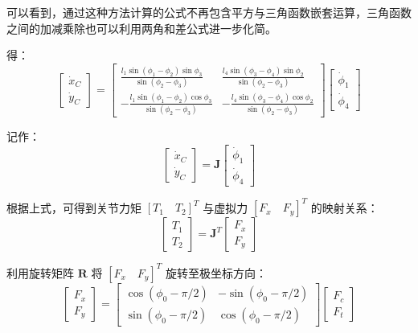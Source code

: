 \documentclass[
  oneside,
  degree=bachelor,
  fullwidthstop=false,
  fontset=fandol,
  times=false,
  minted=true,
  biblatex=true,
]{tongjithesis}
\begin{document}
可以看到，通过这种方法计算的公式不再包含平方与三角函数嵌套运算，三角函数之间的加减乘除也可以利用两角和差公式进一步化简。

得：
\begin{equation}
    \begin{bmatrix}
        \dot{x}_C \\ \dot{y}_C
    \end{bmatrix} = 
    \begin{bmatrix}
        \frac{l_1 \sin(\phi_1 - \phi_2) \sin \phi_3}{\sin(\phi_2 - \phi_3)} & \frac{l_4 \sin(\phi_3 - \phi_4) \sin \phi_2}{\sin(\phi_2 - \phi_3)} \\
        -\frac{l_1 \sin(\phi_1 - \phi_2) \cos \phi_3}{\sin(\phi_2 - \phi_3)} & -\frac{l_4 \sin(\phi_3 - \phi_4) \cos \phi_2}{\sin(\phi_2 - \phi_3)}
    \end{bmatrix}
    \begin{bmatrix}
        \dot{\phi}_1 \\ \dot{\phi}_4
    \end{bmatrix}
    \label{eq:jacob_full}
\end{equation}

记作：
\begin{equation}
    \begin{bmatrix}
        \dot{x}_C \\ \dot{y}_C
    \end{bmatrix} = \boldsymbol{J}
    \begin{bmatrix}
        \dot{\phi}_1 \\ \dot{\phi}_4
    \end{bmatrix}
\end{equation}

根据上式，可得到关节力矩 $[T_1 \quad T_2]^T$ 与虚拟力 $[F_x \quad F_y]^T$ 的映射关系：
\begin{equation}
    \begin{bmatrix}
        T_1 \\ T_2
    \end{bmatrix} = \boldsymbol{J}^T
    \begin{bmatrix}
        F_x \\ F_y
    \end{bmatrix}
\end{equation}

利用旋转矩阵 $\boldsymbol{R}$ 将 $[F_x \quad F_y]^T$ 旋转至极坐标方向：
\begin{equation}
    \begin{bmatrix}
        F_x \\ F_y
    \end{bmatrix} = 
    \begin{bmatrix}
        \cos(\phi_0 - \pi/2) & -\sin(\phi_0 - \pi/2) \\
        \sin(\phi_0 - \pi/2) & \cos(\phi_0 - \pi/2)
    \end{bmatrix}
    \begin{bmatrix}
        F_c \\ F_t
    \end{bmatrix}
\end{equation}
\end{document}
